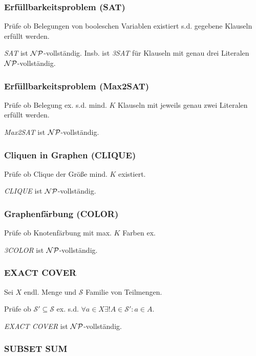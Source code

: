 \subsubsection*{Erfüllbarkeitsproblem (SAT)}

Prüfe ob Belegungen von booleschen Variablen existiert s.d. gegebene Klauseln erfüllt werden.

\spacing

\emph{SAT} ist $\mathcal{NP}$-vollständig. Insb. ist \emph{3SAT} für Klauseln mit genau drei Literalen $\mathcal{NP}$-vollständig.

\subsubsection*{Erfüllbarkeitsproblem (Max2SAT)}

Prüfe ob Belegung ex. s.d. mind. $K$ Klauseln mit jeweils genau zwei Literalen erfüllt werden.

\emph{Max2SAT} ist $\mathcal{NP}$-vollständig.

\subsubsection*{Cliquen in Graphen (CLIQUE)}

Prüfe ob Clique der Größe mind. $K$ existiert.

\emph{CLIQUE} ist $\mathcal{NP}$-vollständig.

\subsubsection*{Graphenfärbung (COLOR)}

Prüfe ob Knotenfärbung mit max. $K$ Farben ex.

\emph{3COLOR} ist $\mathcal{NP}$-vollständig.

\subsubsection*{EXACT COVER}

Sei $X$ endl. Menge und $\mathcal{S}$ Familie von Teilmengen.

Prüfe ob $\mathcal{S}' \subseteq \mathcal{S}$ ex. s.d. $\forall a \in X \exists! A \in \mathcal{S}' : a \in A$.

\emph{EXACT COVER} ist $\mathcal{NP}$-vollständig.

\subsubsection*{SUBSET SUM}


